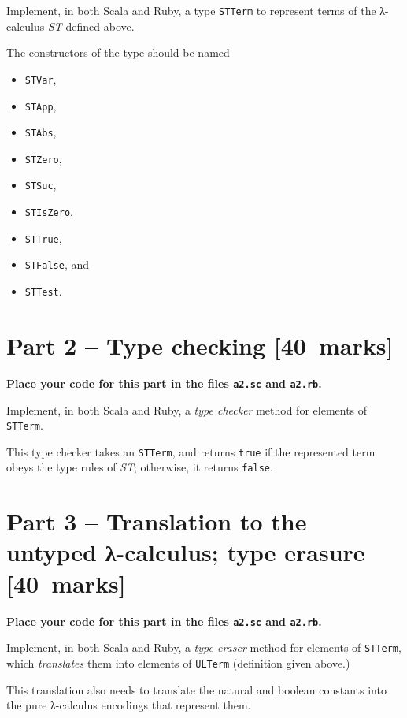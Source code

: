\documentclass[11pt]{article}
\theoremstyle{definition}
\begin{document}
Implement, in both Scala and Ruby,
a type \texttt{STTerm} to represent terms of the λ-calculus \emph{ST} defined above.

The constructors of the type should be named
\begin{itemize}
\item \texttt{STVar},
\item \texttt{STApp},
\item \texttt{STAbs},
\item \texttt{STZero},
\item \texttt{STSuc},
\item \texttt{STIsZero},
\item \texttt{STTrue},
\item \texttt{STFalse}, and
\item \texttt{STTest}.
\end{itemize}

\section*{Part 2 – Type checking                                       [40 marks]}
\label{sec:orgcde9af7}
\begin{center}
\textbf{Place your code for this part in the files \texttt{a2.sc} and \texttt{a2.rb}.}
\end{center}

Implement, in both Scala and Ruby,
a \emph{type checker} method for elements of \texttt{STTerm}.

This type checker takes an \texttt{STTerm}, and returns \texttt{true} if
the represented term obeys the type rules of \emph{ST};
otherwise, it returns \texttt{false}.

\section*{Part 3 – Translation to the untyped λ-calculus; type erasure [40 marks]}
\label{sec:orgdd98bd9}
\begin{center}
\textbf{Place your code for this part in the files \texttt{a2.sc} and \texttt{a2.rb}.}
\end{center}

Implement, in both Scala and Ruby,
a \emph{type eraser} method for elements of \texttt{STTerm},
which \emph{translates} them into elements of \texttt{ULTerm} (definition given above.)

This translation also needs to translate the natural and boolean constants
into the pure λ-calculus encodings that represent them.
\end{document}
